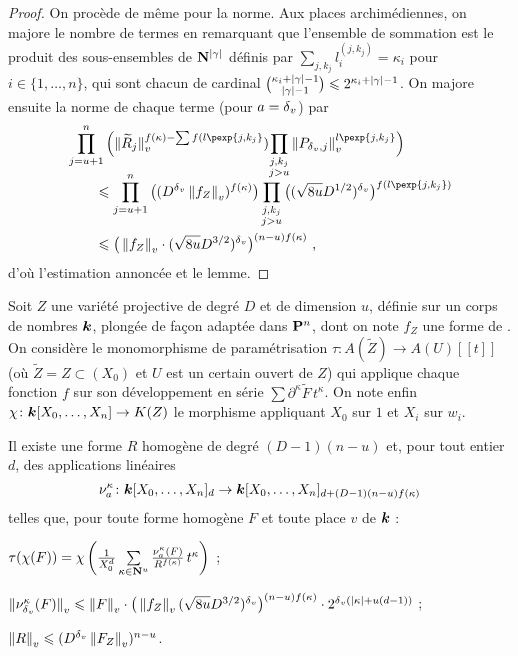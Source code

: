 \begin{proof}
  On procède de même pour la norme. Aux places archimédiennes, on majore le
  nombre de termes en remarquant que l'ensemble de sommation est le produit des
  sous-ensembles de $\mathbf{N}^{{\lvert\gamma\rvert}}$ définis par $\sum_{j, k_j} l_i^ {(j, k_j)}
  = \kappa_i$ pour $i \in \{1,\ldots,n\}$, qui sont chacun de cardinal
  $\binom{\kappa_i + {\lvert\gamma\rvert} - 1}{{\lvert\gamma\rvert} - 1} \leqslant 2^{\kappa_i +
    {\lvert\gamma\rvert} - 1}$. On majore ensuite la norme de chaque terme (pour $a =
  {\delta\smash{_v}}$) par
  \begin{align*}
    & \prod_{j=u+1}^n \left( \nv{\smash{\widetilde R_j}}^{f(\kappa) - \sum
        f(l\pexp{j, k_j}}) \smash{\prod_{\substack{j, k_j \\ j > u}}}
      \nv{P_{\dv, j}}^{l\pexp{j, k_j}} \right) \\
    & \qquad\le \prod_{j=u+1}^n \big( (D^\dv \nv{f_Z})^{f(\kappa)} \big)
      \prod_{\substack{j, k_j \\ j > u}}  \big( (\sqrt{8u} D^{1/2})^\dv
      \big)^{f(l\pexp{j, k_j})} \\
    & \qquad\le \big( \nv{f_Z} \cdot (\sqrt{8u}D^{3/2})^\dv
      \big)^{(n-u)f(\kappa)} \pmm,
  \end{align*}
  d'où l'estimation annoncée et le lemme.
\end{proof}

\begin{lem} \label{l-param}
  Soit $Z$ une variété projective de degré $D$ et de dimension $u$, définie
  sur un corps de nombres $\boldsymbol{k}$, plongée de façon adaptée dans $\mathbf{P}^n$, dont
  on note $f_Z$ une forme de . On considère le monomorphisme de
  paramétrisation $\tau \colon A(\widetilde Z) \to A(U)[[t]]$ (où $\widetilde Z
  = Z \subset (X_0)$ et $U$ est un certain ouvert de $Z$) qui applique chaque
  fonction $f$ sur son développement en série $\sum \partial^\kappa \tilde F \,
  t^\kappa$.  On note enfin $\chi \colon \boldsymbol{k}[X_0, \ldots, X_n] \to K(Z)$ le
  morphisme appliquant $X_0$ sur $1$ et $X_i$ sur $w_i$.

  Il existe une forme $R$ homogène de degré $(D-1)(n-u)$ et, pour tout entier
  $d$, des applications linéaires \[ \nu_a^\kappa \colon \boldsymbol{k}[X_0, \ldots,
  X_n]_d \to \boldsymbol{k}[X_0, \ldots, X_n]_{d + (D-1)(n-u)f(\kappa)} \] telles que,
  pour toute forme homogène $F$ et toute place $v$ de $\boldsymbol{k}$ :
  \begin{enumthm}
    \item $\tau(\chi(F)) = \chi\left( \frac1{X_0^d} \sum\limits_{\kappa \in
        \mathbf{N}^u} \frac {\nu_a^\kappa(F)} {R^{f(\kappa)}} \, t^\kappa \right)$  ;
    \item $\left\lVert\nu_{\delta\smash{_v}}^\kappa(F)\right\rVert_{v} \leqslant \left\lVert F\right\rVert_{v} \cdot \big( \left\lVert f_Z\right\rVert_{v}
      (\sqrt{8u}D^{3/2})^{\delta\smash{_v}} \big)^{(n-u)f(\kappa)} \cdot 2^{{\delta\smash{_v}} ({\lvert\kappa\rvert} +
        u(d-1))}$ ; \label{i-norme}
    \item $\left\lVert R\right\rVert_{v} \leqslant (D^{\delta\smash{_v}} \left\lVert F_Z\right\rVert_{v})^{n-u}$.
  \end{enumthm}
\end{lem}

